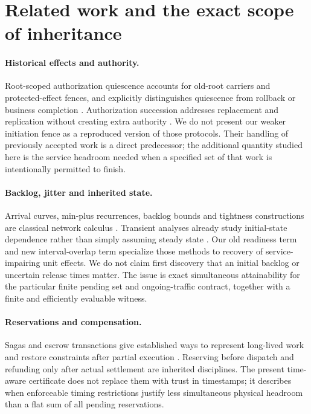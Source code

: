 \documentclass[11pt,a4paper]{article}
\theoremstyle{definition}\newtheorem{definition}{Definition}
\begin{document}
\section{Related work and the exact scope of inheritance}
\label{sec:related}
\paragraph{Historical effects and authority.}
Root-scoped authorization quiescence accounts for old-root carriers and protected-effect fences, and explicitly distinguishes quiescence from rollback or business completion \cite{quiescence}. Authorization succession addresses replacement and replication without creating extra authority \cite{succession}. We do not present our weaker initiation fence as a reproduced version of those protocols. Their handling of previously accepted work is a direct predecessor; the additional quantity studied here is the service headroom needed when a specified set of that work is intentionally permitted to finish.

\paragraph{Backlog, jitter and inherited state.}
Arrival curves, min-plus recurrences, backlog bounds and tightness constructions are classical network calculus \cite{netcal}. Transient analyses already study initial-state dependence rather than simply assuming steady state \cite{transient}. Our old readiness term and new interval-overlap term specialize those methods to recovery of service-impairing unit effects. We do not claim first discovery that an initial backlog or uncertain release times matter. The issue is exact simultaneous attainability for the particular finite pending set and ongoing-traffic contract, together with a finite and efficiently evaluable witness.

\paragraph{Reservations and compensation.}
Sagas and escrow transactions give established ways to represent long-lived work and restore constraints after partial execution \cite{sagas,escrow}. Reserving before dispatch and refunding only after actual settlement are inherited disciplines. The present time-aware certificate does not replace them with trust in timestamps; it describes when enforceable timing restrictions justify less simultaneous physical headroom than a flat sum of all pending reservations.
\end{document}
